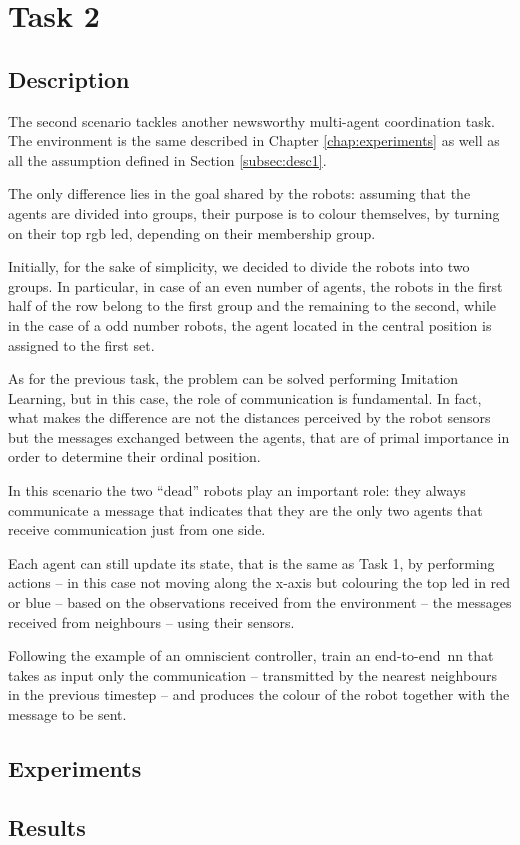 \section{Task 2}
\label{sec:task2}

\subsection{Description}
\label{subsec:desc2}

The second scenario tackles another newsworthy multi-agent coordination task. 
The environment is the same described in Chapter \ref{chap:experiments} as 
well as all the assumption defined in Section \ref{subsec:desc1}.

The only difference lies in the goal shared by the robots: assuming that the agents 
are divided into groups, their purpose is to colour themselves, by turning on their 
top \gls{rgb} \gls{led}, depending on their membership group.

Initially, for the sake of simplicity, we decided to divide the robots into two 
groups. In particular, in case of an even number of agents, the robots in the first 
half of the row belong to the first group and the remaining to the second, while in 
the case of a odd number robots, the agent located in the central position is 
assigned to the first set.

As for the previous task, the problem can be solved performing Imitation 
Learning, but in this case, the role of communication is fundamental. In fact, what 
makes the difference are not the distances perceived by the robot sensors but the 
messages exchanged between the agents, that are of primal importance in order 
to determine their ordinal position. 

In this scenario the two ``dead'' robots play an important role: they always 
communicate a message that indicates that they are the only two agents that 
receive communication just from one side.

Each agent can still update its state, that is the same as Task 1, by performing 
actions – in this case not moving along the x-axis but colouring the top \gls{led} 
in red or blue – based on the observations received from the environment – the 
messages received from neighbours – using their sensors. 

Following the example of an omniscient controller, train an end-to-end \gls{nn} 
that takes as input only the communication – transmitted by the nearest 
neighbours in the previous timestep – and produces the colour of the robot 
together with the message to be sent.


\subsection{Experiments}
\label{subsec:ex2}

\subsection{Results}
\label{subsec:results2}
